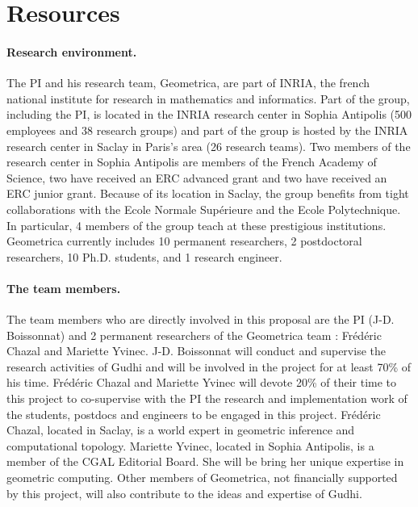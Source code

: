 








\section{Resources}

\paragraph{Research environment.}
The PI and his research team, Geometrica, are part of INRIA, the french national institute for research in mathematics and informatics. Part of the group, including the PI, is located in the INRIA research center in Sophia Antipolis  (500 employees and 38 research groups) and part of the group is hosted by the INRIA research center in Saclay in Paris's area (26 research teams). Two members of the research center in Sophia Antipolis are members of the French Academy of Science, two have received an ERC advanced grant and two have received an ERC junior grant. Because of its location in Saclay, the group benefits from tight collaborations with the Ecole Normale Sup\'erieure and the Ecole Polytechnique. In particular, 4 members of the group teach at these prestigious institutions. Geometrica currently includes 10 permanent researchers,  2 postdoctoral researchers, 10 Ph.D. students, and 1 research engineer. 

\paragraph{The team members.}
The team members who are directly involved in this proposal are the PI (J-D. Boissonnat) and 2 permanent researchers of the Geometrica team : Fr\'ed\'eric Chazal and Mariette Yvinec.  J-D. Boissonnat will conduct and supervise the research activities of Gudhi and will be involved in the project for at least 70\% of his time.  Fr\'ed\'eric Chazal and Mariette Yvinec will devote 20\% of their time to this project to co-supervise with the PI the research and implementation work of the students, postdocs and engineers to be engaged in this project. Fr\'ed\'eric Chazal, located in Saclay,  is a world expert in geometric inference and computational topology. Mariette Yvinec, located in Sophia Antipolis,  is a member of the CGAL Editorial Board. She  will be bring her unique expertise in geometric computing. Other members of Geometrica, not financially supported by this project, will also contribute to the ideas and expertise of Gudhi.


